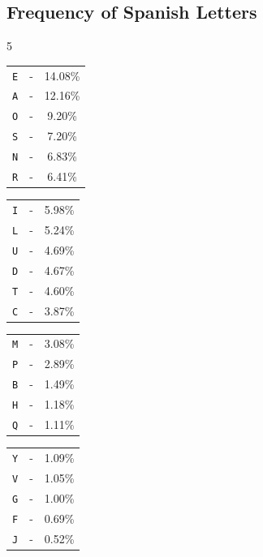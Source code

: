 \documentclass{article}
\numberwithin{figure}{section}
\numberwithin{equation}{section}
\begin{document}
\subsection*{Frequency of Spanish Letters}

\begin{multicols}{5}
\begin{center}
\begin{tabular}{ccc}
\verb|E| & - & 14.08\% \\
\verb|A| & - & 12.16\% \\
\verb|O| & - & 9.20\% \\
\verb|S| & - & 7.20\% \\
\verb|N| & - & 6.83\% \\
\verb|R| & - & 6.41\% \\
\end{tabular}
\end{center}

\begin{center}
\begin{tabular}{ccc}
\verb|I| & - & 5.98\% \\
\verb|L| & - & 5.24\% \\
\verb|U| & - & 4.69\% \\
\verb|D| & - & 4.67\% \\
\verb|T| & - & 4.60\% \\
\verb|C| & - & 3.87\% \\
\end{tabular}
\end{center}

\begin{center}
\begin{tabular}{ccc}
\verb|M| & - & 3.08\% \\
\verb|P| & - & 2.89\% \\
\verb|B| & - & 1.49\% \\
\verb|H| & - & 1.18\% \\
\verb|Q| & - & 1.11\% \\
\end{tabular}
\end{center}

\begin{center}
\begin{tabular}{ccc}
\verb|Y| & - & 1.09\% \\
\verb|V| & - & 1.05\% \\
\verb|G| & - & 1.00\% \\
\verb|F| & - & 0.69\% \\
\verb|J| & - & 0.52\% \\
\end{tabular}
\end{center}


\end{multicols}
\end{document}
